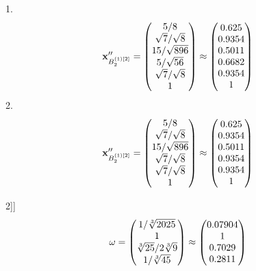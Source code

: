 \documentclass[10pt,a4paper]{article}
\begin{document}
	1.
	\[
		\bold{x}''_{B_2^{(1)[2]}} = 
		\begin{pmatrix}
			{{5}} / {{8}} \\
			{\sqrt{7}} / {\sqrt{8}} \\
			{{15}} / {\sqrt{896}} \\
			{{5}} / {\sqrt{56}} \\
			{\sqrt{7}} / {\sqrt{8}} \\
			{1}{} \\
		\end{pmatrix}
		\approx
		\begin{pmatrix}
			0.625    \\
			0.9354   \\
			0.5011   \\
			0.6682   \\
			0.9354   \\
			1        \\
		\end{pmatrix}
	\]
	2.
	\[
		\bold{x}''_{B_2^{(1)[2]}} = 
		\begin{pmatrix}
			{{5}} / {{8}} \\
			{\sqrt{7}} / {\sqrt{8}} \\
			{{15}} / {\sqrt{896}} \\
			{\sqrt{7}} / {\sqrt{8}} \\
			{\sqrt{7}} / {\sqrt{8}} \\
			{1}{} \\
		\end{pmatrix}
		\approx
		\begin{pmatrix}
			0.625    \\
			0.9354   \\
			0.5011   \\
			0.9354   \\
			0.9354   \\
			1        \\
		\end{pmatrix}
	\]

2]]
	\[
		\bold{\omega} = 
		\begin{pmatrix}
			{1} / {\sqrt[3]{2025}} \\
			{1}{} \\
			{\sqrt[3]{25}} / {{2}\sqrt[3]{9}} \\
			{1} / {\sqrt[3]{45}} \\
		\end{pmatrix}
		\approx
		\begin{pmatrix}
			0.07904  \\
			1        \\
			0.7029   \\
			0.2811   \\
		\end{pmatrix}
	\]
\end{document}
